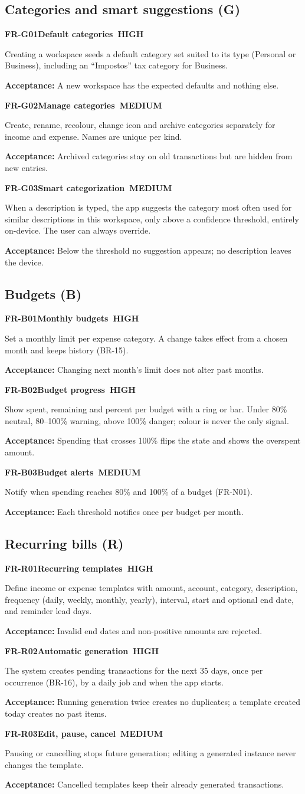 \documentclass[11pt,a4paper]{article}
\newcommand{\PH}{\colorbox{finlyblue}{\color{white}\scriptsize\bfseries\ HIGH\ }}
\newcommand{\PM}{\colorbox{finlygold}{\color{finlydark}\scriptsize\bfseries\ MEDIUM\ }}
\newcommand{\req}[5]{%
  \begin{tcolorbox}[reqbox]
    {\small\textbf{\textcolor{finlyblue}{#1}}\quad\textbf{#2}\hfill #3}\par\vspace{2pt}
    {\small #4}\par\vspace{2pt}
    {\footnotesize\textcolor{finlytext}{\textbf{Acceptance:} #5}}
  \end{tcolorbox}}
\begin{document}
\subsection{Categories and smart suggestions (G)}
\req{FR-G01}{Default categories}{\PH}{Creating a workspace seeds a default category set suited to its type (Personal or Business), including an ``Impostos'' tax category for Business.}
{A new workspace has the expected defaults and nothing else.}
\req{FR-G02}{Manage categories}{\PM}{Create, rename, recolour, change icon and archive categories separately for income and expense. Names are unique per kind.}
{Archived categories stay on old transactions but are hidden from new entries.}
\req{FR-G03}{Smart categorization}{\PM}{When a description is typed, the app suggests the category most often used for similar descriptions in this workspace, only above a confidence threshold, entirely on-device. The user can always override.}
{Below the threshold no suggestion appears; no description leaves the device.}

\subsection{Budgets (B)}
\req{FR-B01}{Monthly budgets}{\PH}{Set a monthly limit per expense category. A change takes effect from a chosen month and keeps history (BR-15).}
{Changing next month's limit does not alter past months.}
\req{FR-B02}{Budget progress}{\PH}{Show spent, remaining and percent per budget with a ring or bar. Under 80\% neutral, 80--100\% warning, above 100\% danger; colour is never the only signal.}
{Spending that crosses 100\% flips the state and shows the overspent amount.}
\req{FR-B03}{Budget alerts}{\PM}{Notify when spending reaches 80\% and 100\% of a budget (FR-N01).}
{Each threshold notifies once per budget per month.}

\subsection{Recurring bills (R)}
\req{FR-R01}{Recurring templates}{\PH}{Define income or expense templates with amount, account, category, description, frequency (daily, weekly, monthly, yearly), interval, start and optional end date, and reminder lead days.}
{Invalid end dates and non-positive amounts are rejected.}
\req{FR-R02}{Automatic generation}{\PH}{The system creates pending transactions for the next 35 days, once per occurrence (BR-16), by a daily job and when the app starts.}
{Running generation twice creates no duplicates; a template created today creates no past items.}
\req{FR-R03}{Edit, pause, cancel}{\PM}{Pausing or cancelling stops future generation; editing a generated instance never changes the template.}
{Cancelled templates keep their already generated transactions.}
\end{document}
